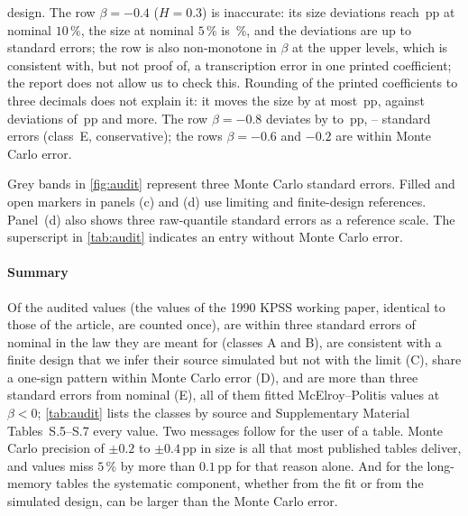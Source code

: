 design. The row $\beta=-0.4$ ($H=0.3$) is inaccurate: its size deviations reach \,pp at
nominal $10\,\%$, the size at nominal $5\,\%$ is \,\%, and the deviations are up to
 standard errors; the row is also non-monotone in $\beta$ at the upper levels, which is consistent with, but not proof of, a
transcription error in one printed coefficient; the report does not allow us to check this. Rounding of the printed
coefficients to three decimals does not explain it: it moves the size by at most \,pp,
against deviations of \,pp and more. The row $\beta=-0.8$ deviates by  to
\,pp, -- standard errors (class~E,
conservative); the rows $\beta=-0.6$ and $-0.2$ are within Monte Carlo error.

Grey bands in \cref{fig:audit} represent three Monte Carlo standard errors. Filled and open markers in panels
(c) and (d) use limiting and finite-design references. Panel~(d) also shows three raw-quantile standard errors
as a reference scale. The superscript in \cref{tab:audit} indicates an entry without Monte Carlo error.

\paragraph{Summary} Of the  audited values (the  values of the 1990 KPSS working
paper, identical to those of the article, are counted once),  are within three standard errors
of nominal in the law they are meant for (classes A and B),  are consistent with a finite design that
we infer their source simulated but not with the limit (C),  share a one-sign pattern within Monte
Carlo error (D), and
 are more than three standard errors from nominal (E), all of them fitted McElroy--Politis values
at $\beta<0$; \cref{tab:audit} lists the classes by source and Supplementary Material Tables~S.5--S.7 every value. Two messages follow for the
user of a table. Monte Carlo precision of $\pm0.2$ to $\pm0.4$\,pp in size is all that most published tables deliver,
and  values miss $5\,\%$ by more than $0.1$\,pp for that reason alone. And for the long-memory tables
the systematic component, whether from the fit or from the simulated design, can be larger than the Monte Carlo error.

\begin{table}[tbp]\centering\small
\caption{Published critical values classified by source, size discrepancy and simulation uncertainty.}\label{tab:audit}
%
\end{table}
\FloatBarrier
